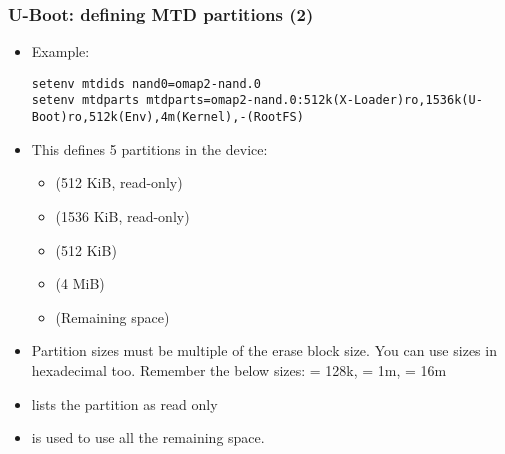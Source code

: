 \begin{frame}[fragile]
  \frametitle{U-Boot: defining MTD partitions (2)}
  \begin{itemize}
  \item Example:
  {\tiny
  \begin{verbatim}
setenv mtdids nand0=omap2-nand.0
setenv mtdparts mtdparts=omap2-nand.0:512k(X-Loader)ro,1536k(U-Boot)ro,512k(Env),4m(Kernel),-(RootFS)
  \end{verbatim}
  }
  \item This defines 5 partitions in the  device:
    \begin{itemize}
    \item {} (512 KiB, read-only)
    \item {} (1536 KiB, read-only)
    \item {} (512 KiB)
    \item {} (4 MiB)
    \item {} (Remaining space)
    \end{itemize}
  \item Partition sizes must be multiple of the erase block size.
    You can use sizes in hexadecimal too. Remember the below sizes:
     = 128k,  = 1m,  = 16m
  \item {} lists the partition as read only
  \item \code{-} is used to use all the remaining space.
  \end{itemize}
\end{frame}


